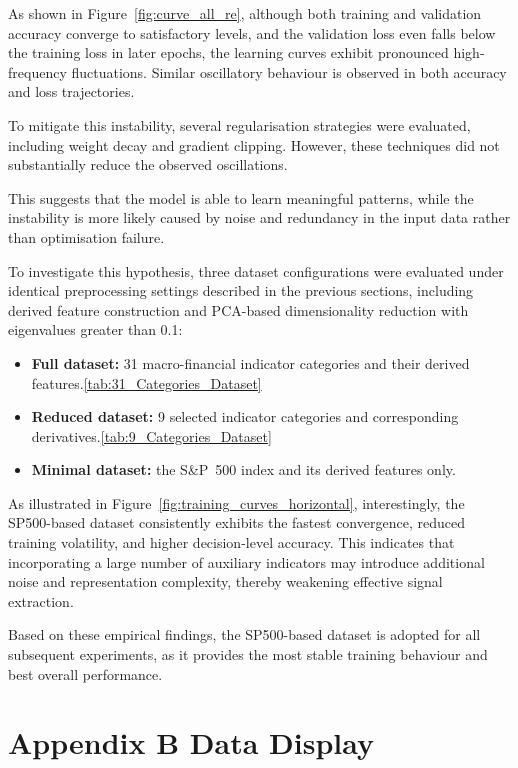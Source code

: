 \documentclass[10pt]{article} %
\begin{document}
As shown in Figure~\ref{fig:curve_all_re}, although both training and validation accuracy converge to satisfactory levels, and the validation loss even falls below the training loss in later epochs, the learning curves exhibit pronounced high-frequency fluctuations. Similar oscillatory behaviour is observed in both accuracy and loss trajectories.

To mitigate this instability, several regularisation strategies were evaluated, including weight decay and gradient clipping. However, these techniques did not substantially reduce the observed oscillations.

This suggests that the model is able to learn meaningful patterns, while the instability is more likely caused by noise and redundancy in the input data rather than optimisation failure.

To investigate this hypothesis, three dataset configurations were evaluated under identical preprocessing settings described in the previous sections, including derived feature construction and PCA-based dimensionality reduction with eigenvalues greater than 0.1:

\begin{itemize}
    \item \textbf{Full dataset:} 31 macro-financial indicator categories and their derived features.\ref{tab:31_Categories_Dataset}
    \item \textbf{Reduced dataset:} 9 selected indicator categories and corresponding derivatives.\ref{tab:9_Categories_Dataset}
    \item \textbf{Minimal dataset:} the S\&P~500 index and its derived features only.
\end{itemize}

As illustrated in Figure~\ref{fig:training_curves_horizontal}, interestingly, the SP500-based dataset consistently exhibits the fastest convergence, reduced training volatility, and higher decision-level accuracy. This indicates that incorporating a large number of auxiliary indicators may introduce additional noise and representation complexity, thereby weakening effective signal extraction.


Based on these empirical findings, the SP500-based dataset is adopted for all subsequent experiments, as it provides the most stable training behaviour and best overall performance.



\section{Appendix B Data Display}
\end{document}
